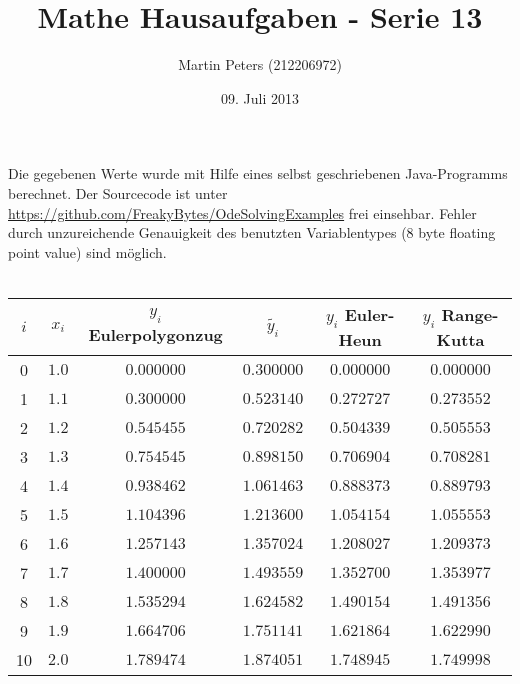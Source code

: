\documentclass{article}
\title{Mathe Hausaufgaben - Serie 13}
\author{Martin Peters (212206972)}
\date{09. Juli 2013}
\begin{document}
	\maketitle
	
	Die gegebenen Werte wurde mit Hilfe eines selbst geschriebenen Java-Programms berechnet. Der Sourcecode ist unter \href{https://github.com/FreakyBytes/OdeSolvingExamples}{https://github.com/FreakyBytes/OdeSolvingExamples} frei einsehbar. Fehler durch unzureichende Genauigkeit des benutzten Variablentypes (8 byte floating point value) sind möglich.	\\ \\
	
	\begin{tabular}{|c|c|c|c|c|c|}
		\hline
		\(i\) & \(x_i\) & \(y_i\) Eulerpolygonzug & \(\tilde{y_i}\) & \(y_i\) Euler-Heun & \(y_i\) Range-Kutta \\
		\hline 
		0  & \(1.0\) & \(0.000000\) & \(0.300000\) & \(0.000000\) & \(0.000000\) \\ \hline
		1  & \(1.1\) & \(0.300000\) & \(0.523140\) & \(0.272727\) & \(0.273552\) \\ \hline
		2  & \(1.2\) & \(0.545455\) & \(0.720282\) & \(0.504339\) & \(0.505553\) \\ \hline
		3  & \(1.3\) & \(0.754545\) & \(0.898150\) & \(0.706904\) & \(0.708281\) \\ \hline
		4  & \(1.4\) & \(0.938462\) & \(1.061463\) & \(0.888373\) & \(0.889793\) \\ \hline
		5  & \(1.5\) & \(1.104396\) & \(1.213600\) & \(1.054154\) & \(1.055553\) \\ \hline
		6  & \(1.6\) & \(1.257143\) & \(1.357024\) & \(1.208027\) & \(1.209373\) \\ \hline
		7  & \(1.7\) & \(1.400000\) & \(1.493559\) & \(1.352700\) & \(1.353977\) \\ \hline
		8  & \(1.8\) & \(1.535294\) & \(1.624582\) & \(1.490154\) & \(1.491356\) \\ \hline
		9  & \(1.9\) & \(1.664706\) & \(1.751141\) & \(1.621864\) & \(1.622990\) \\ \hline
		10 & \(2.0\) & \(1.789474\) & \(1.874051\) & \(1.748945\) & \(1.749998\) \\ \hline
	\end{tabular}
\end{document}
